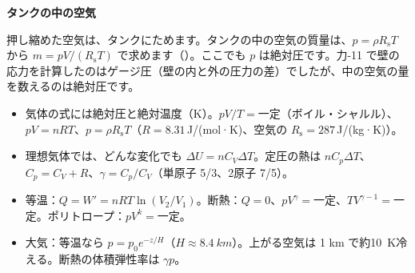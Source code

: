 \noindent\textbf{タンクの中の空気}\par\nobreak
押し縮めた空気は、タンクにためます。タンクの中の空気の質量は、$p=\rho R_{\mathrm s}T$ から $m=pV/(R_{\mathrm s}T)$ で求めます（）。ここでも $p$ は絶対圧です。力-11 で壁の応力を計算したのはゲージ圧（壁の内と外の圧力の差）でしたが、中の空気の量を数えるのは絶対圧です。

\begin{taisetsu}
\begin{itemize}[leftmargin=1.2\zw, itemsep=2pt, topsep=0pt, label={\color{bkNavy}●}]
\item 気体の式には絶対圧と絶対温度（K）。$pV/T=$一定（ボイル・シャルル）、$pV=nRT$、$p=\rho R_{\mathrm s}T$（$R=8.31$\,J/(mol·K)、空気の $R_{\mathrm s}=287$\,J/(kg·K)）。
\item 理想気体では、どんな変化でも $\Delta U=nC_V\Delta T$。定圧の熱は $nC_p\Delta T$、$C_p=C_V+R$、$\gamma=C_p/C_V$（単原子 5/3、2原子 7/5）。
\item 等温：$Q=W'=nRT\ln(V_2/V_1)$。断熱：$Q=0$、$pV^\gamma=$一定、$TV^{\gamma-1}=$一定。ポリトロープ：$pV^k=$一定。
\item 大気：等温なら $p=p_0e^{-z/H}$（$H\approx\qty{8.4}{km}$）。上がる空気は 1 km で約\qty{10}{K}冷える。断熱の体積弾性率は $\gamma p$。
\end{itemize}
\end{taisetsu}

\begin{kotoba}\small
{}
\end{kotoba}


